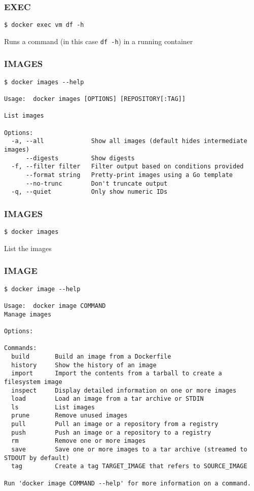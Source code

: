 \begin{frame}[fragile]
\frametitle{EXEC}
\begin{lstlisting}
$ docker exec vm df -h
\end{lstlisting}

Runs a command (in this case \lstinline!df -h!) in a running container
\end{frame}

\begin{frame}[fragile]
\frametitle{IMAGES}
\scriptsize
\begin{lstlisting}[breaklines=true]
$ docker images --help

Usage:  docker images [OPTIONS] [REPOSITORY[:TAG]]

List images

Options:
  -a, --all             Show all images (default hides intermediate images)
      --digests         Show digests
  -f, --filter filter   Filter output based on conditions provided
      --format string   Pretty-print images using a Go template
      --no-trunc        Don't truncate output
  -q, --quiet           Only show numeric IDs
\end{lstlisting}
\normalsize
\end{frame}


\begin{frame}[fragile]
\frametitle{IMAGES}
\begin{lstlisting}
$ docker images
\end{lstlisting}

List the images 
\end{frame}

\begin{frame}[fragile]
\frametitle{IMAGE}
\scriptsize
\begin{lstlisting}[breaklines=true]
$ docker image --help

Usage:  docker image COMMAND
Manage images

Options:

Commands:
  build       Build an image from a Dockerfile
  history     Show the history of an image
  import      Import the contents from a tarball to create a filesystem image
  inspect     Display detailed information on one or more images
  load        Load an image from a tar archive or STDIN
  ls          List images
  prune       Remove unused images
  pull        Pull an image or a repository from a registry
  push        Push an image or a repository to a registry
  rm          Remove one or more images
  save        Save one or more images to a tar archive (streamed to STDOUT by default)
  tag         Create a tag TARGET_IMAGE that refers to SOURCE_IMAGE

Run 'docker image COMMAND --help' for more information on a command.
\end{lstlisting}
\normalsize
\end{frame}

